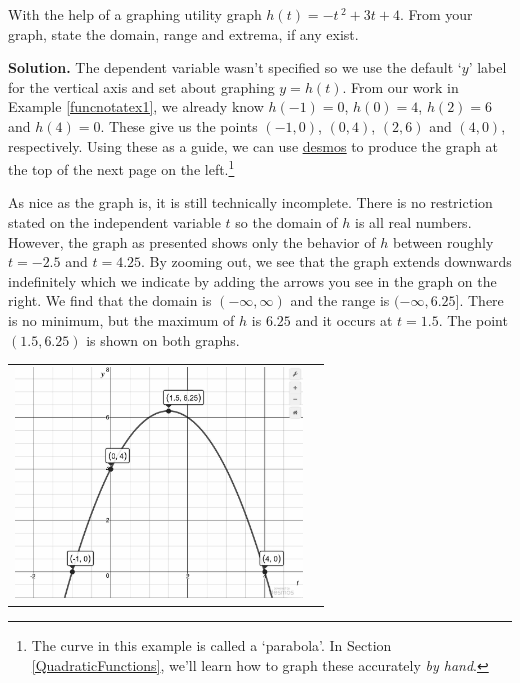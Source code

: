 \begin{ex} \label{graphalgebraicex}  With the help of a graphing utility graph $h(t) = -t\,^{2} + 3t + 4$.  From your graph, state the domain, range and extrema, if any exist.

{\bf Solution.} The dependent variable wasn't specified so we use the default `$y$' label for the vertical axis and set about graphing $y = h(t)$.   From our work in Example \ref{funcnotatex1},  we already know  $h(-1) = 0$, $h(0) = 4$, $h(2) = 6$ and $h(4) = 0$.  These give us the points $(-1,0)$, $(0,4)$, $(2,6)$ and $(4,0)$, respectively.  Using these as a guide, we can use  \href{https://www.desmos.com/}{\underline{desmos}} to produce the graph at the top of the next page on the left.\footnote{The curve in this example is called a 	`parabola'.  In Section \ref{QuadraticFunctions}, we'll learn how to graph these accurately \textit{by hand}.} 

\medskip

As nice as the graph is, it is still technically incomplete.  There is no restriction stated on the independent variable $t$ so the domain of $h$ is all real numbers. However, the graph as presented shows only the behavior of $h$ between roughly $t = -2.5$ and $t = 4.25$.  By zooming out, we see that the graph extends downwards indefinitely which we indicate by adding the arrows you see in the graph on the right.  We find that the domain is $(-\infty, \infty)$ and the range is $(-\infty, 6.25]$.  There is no minimum, but the  maximum of $h$ is $6.25$ and it occurs at $t = 1.5$.  The point $(1.5, 6.25)$ is shown on both graphs.

\begin{center}

\begin{tabular}{m{3in}m{2in}}


\includegraphics[width=3in]{./FunctionsandtheirRepresentationsGraphics/ParabolaGraph.jpg}


\end{tabular}
\end{center}
\end{ex}
